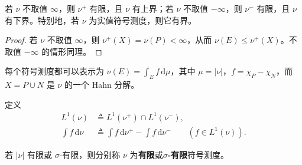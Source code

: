 \documentclass[../../main.tex]{subfiles}%
\begin{document}
\begin{proposition}\label{proposition:ch03-signed-boundedness}
若 $\nu$ 不取值 $\infty$，则 $\nu^+$ 有限，且 $\nu$ 有上界；若 $\nu$ 不取值 $-\infty$，则 $\nu^-$ 有限，且 $\nu$ 有下界。特别地，若 $\nu$ 为实值符号测度，则它有界。
\end{proposition}
\begin{proof}
若 $\nu$ 不取值 $\infty$，则 $\nu^+(X)=\nu(P)<\infty$，从而 $\nu(E)\le\nu^+(X)$。不取值 $-\infty$ 的情形同理。
\end{proof}
\begin{proposition}\label{proposition:ch03-total-variation-density}
每个符号测度都可以表示为 $\nu(E)=\int_E f\,\mathrm{d}\mu$，其中 $\mu=|\nu|$，$f=\chi_P-\chi_N$，而 $X=P\cup N$ 是 $\nu$ 的一个 Hahn 分解。
\end{proposition}
\begin{definition}[关于符号测度的积分]\label{definition:ch03-signed-integration}
定义
\begin{align*}
L^1(\nu)&\triangleq L^1(\nu^+)\cap L^1(\nu^-),\\
\int f\,\mathrm{d}\nu&\triangleq\int f\,\mathrm{d}\nu^+-\int f\,\mathrm{d}\nu^-\qquad(f\in L^1(\nu)).
\end{align*}
\end{definition}
\begin{definition}\label{definition:ch03-finite-signed-measure}
若 $|\nu|$ 有限或 $\sigma$-有限，则分别称 $\nu$ 为\textbf{有限}或\textbf{$\sigma$-有限}符号测度。
\end{definition}
\end{document}
